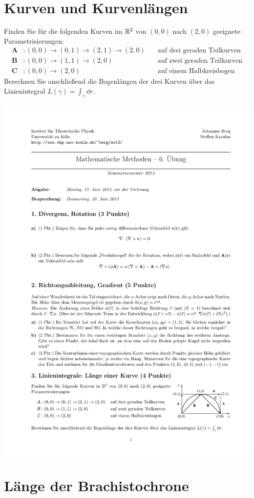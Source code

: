 \documentclass{scrartcl}
\begin{document}
\maketitle


\section{Kurven und Kurvenlängen}
\label{sec:kurven_und_kurvenl_ngen}

Finden Sie für die folgenden Kurven im $\mathbb{R}^2$ von $(0,0)$ nach $(2,0)$ geeignete Parametrisierungen:
\begin{align*}
  \mathbf{A}&\colon (0,0) \to (0,1) \to (2,1) \to (2,0) \quad& \mbox{auf drei geraden Teilkurven} \\
  \mathbf{B}&\colon (0,0) \to (1,1) \to (2,0) \quad& \mbox{auf zwei geraden Teilkurven} \\
  \mathbf{C}&\colon (0,0) \to (2,0)  \quad& \mbox{auf einem Halbkreisbogen}
\end{align*}
Berechnen Sie anschließend die Bogenlängen der drei Kurven über das Linienintegral $L(\gamma) = \int_\gamma \dd r$.

\begin{center}
  \includegraphics[width=.5\textwidth]{img/curves}
\end{center}

\section{Länge der Brachistochrone}
\label{sec:bachistochrone}
\end{document}
